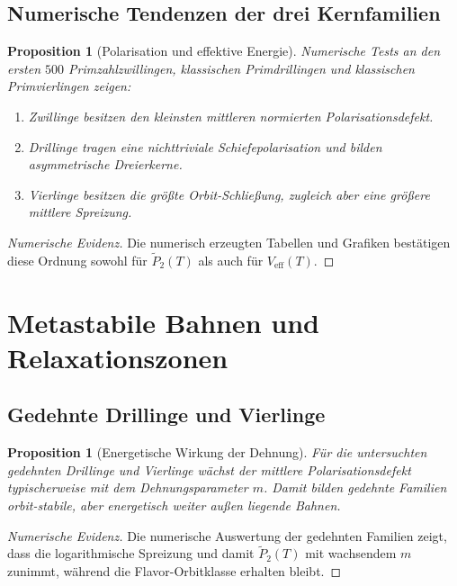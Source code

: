\documentclass[11pt,a4paper]{article}
\theoremstyle{definition}
\theoremstyle{plain}
\newtheorem{proposition}[definition]{Proposition}
\begin{document}
	\subsection{Numerische Tendenzen der drei Kernfamilien}
	
	\begin{proposition}[Polarisation und effektive Energie]
		Numerische Tests an den ersten $500$ Primzahlzwillingen, klassischen Primdrillingen und klassischen Primvierlingen zeigen:
		\begin{enumerate}[label=(\arabic*)]
			\item Zwillinge besitzen den kleinsten mittleren normierten Polarisationsdefekt.
			\item Drillinge tragen eine nichttriviale Schiefepolarisation und bilden asymmetrische Dreierkerne.
			\item Vierlinge besitzen die größte Orbit-Schließung, zugleich aber eine größere mittlere Spreizung.
		\end{enumerate}
	\end{proposition}
	
	\begin{proof}[Numerische Evidenz]
		Die numerisch erzeugten Tabellen und Grafiken bestätigen diese Ordnung sowohl für $\widetilde P_2(T)$ als auch für $V_{\mathrm{eff}}(T)$.
	\end{proof}
	
	\section{Metastabile Bahnen und Relaxationszonen}
	
	\subsection{Gedehnte Drillinge und Vierlinge}
	
	\begin{proposition}[Energetische Wirkung der Dehnung]
		Für die untersuchten gedehnten Drillinge und Vierlinge wächst der mittlere Polarisationsdefekt typischerweise mit dem Dehnungsparameter $m$. Damit bilden gedehnte Familien orbit-stabile, aber energetisch weiter außen liegende Bahnen.
	\end{proposition}
	
	\begin{proof}[Numerische Evidenz]
		Die numerische Auswertung der gedehnten Familien zeigt, dass die logarithmische Spreizung und damit $\widetilde P_2(T)$ mit wachsendem $m$ zunimmt, während die Flavor-Orbitklasse erhalten bleibt.
	\end{proof}
	
\end{document}
